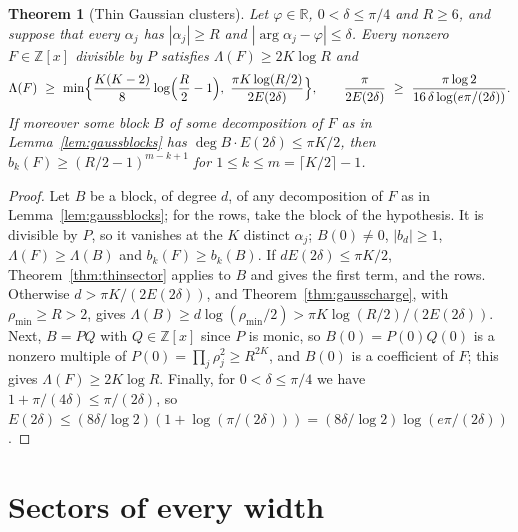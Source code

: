 \documentclass[11pt]{article}
\newtheorem{theorem}{Theorem}[section]
\newcommand{\R}{\mathbb R}
\begin{document}
\begin{theorem}[Thin Gaussian clusters]\label{thm:thingauss}
Let $\varphi\in\R$, $0<\delta\le\pi/4$ and $R\ge6$, and suppose that every
$\alpha_j$ has $|\alpha_j|\ge R$ and $|\arg\alpha_j-\varphi|\le\delta$.  Every
nonzero $F\in\mathbb Z[x]$ divisible by $P$ satisfies $\Lambda(F)\ge2K\log R$
and
\[
  \Lambda(F)\ \ge\ \min\Bigl\{\frac{K(K-2)}8\log\Bigl(\frac R2-1\Bigr),\
  \frac{\pi K\log(R/2)}{2E(2\delta)}\Bigr\},
  \qquad
  \frac{\pi}{2E(2\delta)}\ \ge\ \frac{\pi\log2}{16\,\delta\log(e\pi/(2\delta))}.
\]
If moreover some block $B$ of some decomposition of $F$ as in
Lemma~\ref{lem:gaussblocks} has
$\deg B\cdot E(2\delta)\le\pi K/2$, then
$b_k(F)\ge(R/2-1)^{m-k+1}$ for $1\le k\le m=\lceil K/2\rceil-1$.
\end{theorem}

\begin{proof}
Let $B$ be a block, of degree $d$, of any decomposition of $F$ as in
Lemma~\ref{lem:gaussblocks}; for the rows, take the block of the hypothesis.
It is divisible by $P$, so it
vanishes at the $K$ distinct $\alpha_j$; $B(0)\ne0$, $|b_d|\ge1$,
$\Lambda(F)\ge\Lambda(B)$ and $b_k(F)\ge b_k(B)$.  If $dE(2\delta)\le\pi K/2$,
Theorem~\ref{thm:thinsector} applies to $B$ and gives the first term, and the
rows.  Otherwise $d>\pi K/(2E(2\delta))$, and Theorem~\ref{thm:gausscharge},
with $\rho_{\min}\ge R>2$, gives
$\Lambda(B)\ge d\log(\rho_{\min}/2)>\pi K\log(R/2)/(2E(2\delta))$.  Next,
$B=PQ$ with $Q\in\mathbb Z[x]$ since $P$ is monic, so $B(0)=P(0)Q(0)$ is a
nonzero multiple of $P(0)=\prod_j\rho_j^2\ge R^{2K}$, and $B(0)$ is a
coefficient of $F$; this gives $\Lambda(F)\ge2K\log R$.  Finally, for
$0<\delta\le\pi/4$ we have $1+\pi/(4\delta)\le\pi/(2\delta)$, so
$E(2\delta)\le(8\delta/\log2)(1+\log(\pi/(2\delta)))
=(8\delta/\log2)\log(e\pi/(2\delta))$.
\end{proof}


\section{Sectors of every width}\label{sec:widesectors}
\end{document}
